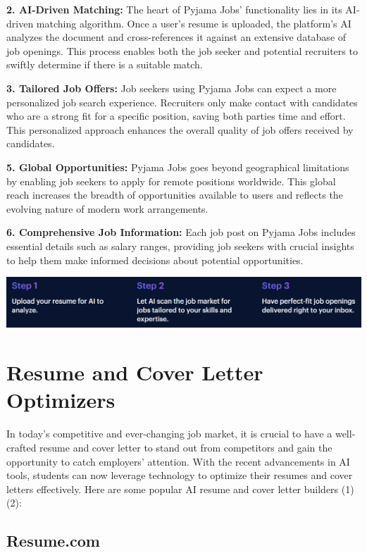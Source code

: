 \documentclass[
]{book}
\begin{document}
\textbf{2. AI-Driven Matching:} The heart of Pyjama Jobs' functionality lies in its AI-driven matching algorithm. Once a user's resume is uploaded, the platform's AI analyzes the document and cross-references it against an extensive database of job openings. This process enables both the job seeker and potential recruiters to swiftly determine if there is a suitable match.

\textbf{3. Tailored Job Offers:} Job seekers using Pyjama Jobs can expect a more personalized job search experience. Recruiters only make contact with candidates who are a strong fit for a specific position, saving both parties time and effort. This personalized approach enhances the overall quality of job offers received by candidates.

\textbf{5. Global Opportunities:} Pyjama Jobs goes beyond geographical limitations by enabling job seekers to apply for remote positions worldwide. This global reach increases the breadth of opportunities available to users and reflects the evolving nature of modern work arrangements.

\textbf{6. Comprehensive Job Information:} Each job post on Pyjama Jobs includes essential details such as salary ranges, providing job seekers with crucial insights to help them make informed decisions about potential opportunities.

\includegraphics[width=5.66667in,height=\textheight]{pyjama jobs.png}

\hypertarget{resume-and-cover-letter-optimizers}{%
\chapter{Resume and Cover Letter Optimizers}\label{resume-and-cover-letter-optimizers}}

In today's competitive and ever-changing job market, it is crucial to have a well-crafted resume and cover letter to stand out from competitors and gain the opportunity to catch employers' attention. With the recent advancements in AI tools, students can now leverage technology to optimize their resumes and cover letters effectively. Here are some popular AI resume and cover letter builders (1) (2):

\hypertarget{resume.com}{%
\section{Resume.com}\label{resume.com}}
\end{document}
